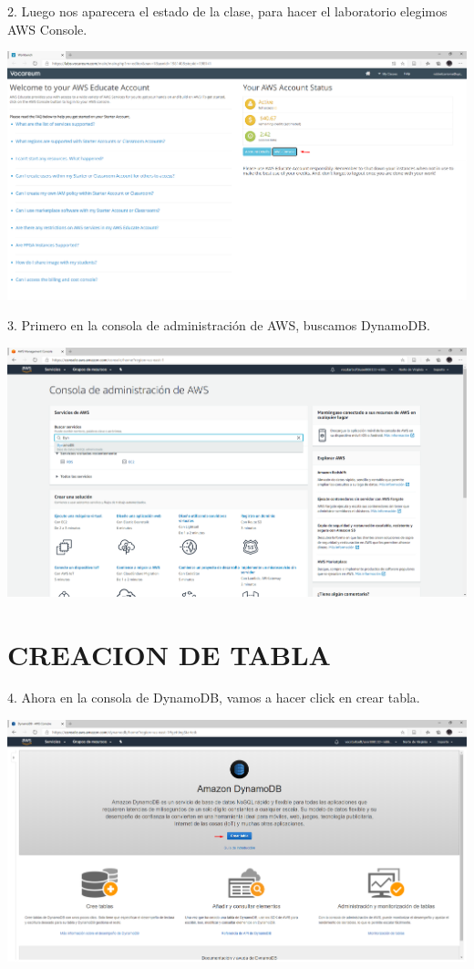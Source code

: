 \documentclass[12pt,letterpaper]{article}
\begin{document}
2.	Luego nos aparecera el estado de la clase, para hacer el laboratorio elegimos AWS Console.

\begin{center}
    \includegraphics[width=15cm]{img/2.png}  
\end{center}
\newpage




3.	Primero en la consola de administración de AWS, buscamos DynamoDB.
\begin{center}
    \includegraphics[width=15cm]{img/3.png}  
\end{center}




\section{ CREACION DE TABLA} 
4.	Ahora en la consola de DynamoDB, vamos a hacer click en crear tabla.
\begin{center}
    \includegraphics[width=15cm]{img/4.png}  
\end{center}
\newpage
\end{document}

